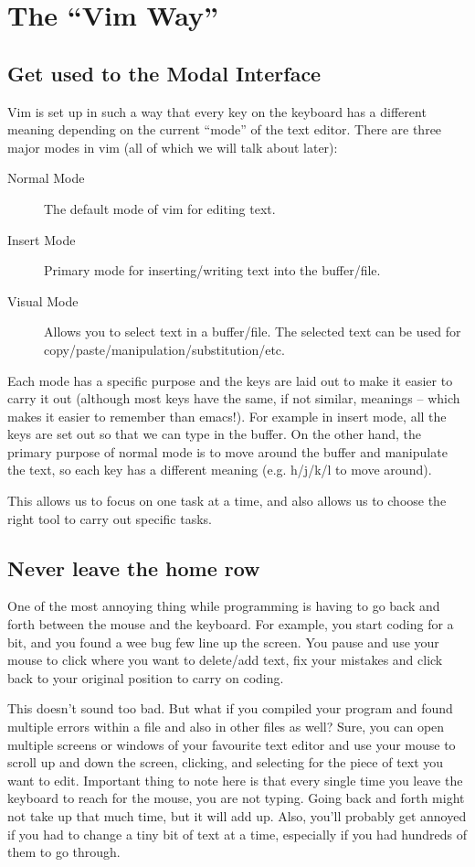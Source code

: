 \chapter{The ``Vim Way''}

\section{Get used to the Modal Interface}

Vim is set up in such a way that every key on the keyboard has a different meaning depending on the current ``mode'' of the text editor.
There are three major modes in vim (all of which we will talk about later):
\begin{description}
    \item [Normal Mode] The default mode of vim for editing text.
    \item [Insert Mode] Primary mode for inserting/writing text into the buffer/file.
    \item [Visual Mode] Allows you to select text in a buffer/file. The selected text can be used for copy/paste/manipulation/substitution/etc.
\end{description}

Each mode has a specific purpose and the keys are laid out to make it easier to carry it out (although most keys have the same, if not similar, meanings -- which makes it easier to remember than emacs!).
For example in insert mode, all the keys are set out so that we can type in the buffer.
On the other hand, the primary purpose of normal mode is to move around the buffer and manipulate the text, so each key has a different meaning (e.g. h/j/k/l to move around).

This allows us to focus on one task at a time, and also allows us to choose the right tool to carry out specific tasks.

\section{Never leave the home row}

One of the most annoying thing while programming is having to go back and forth between the mouse and the keyboard.
For example, you start coding for a bit, and you found a wee bug few line up the screen.
You pause and use your mouse to click where you want to delete/add text, fix your mistakes and click back to your original position to carry on coding.

This doesn't sound too bad.
But what if you compiled your program and found multiple errors within a file and also in other files as well?
Sure, you can open multiple screens or windows of your favourite text editor and use your mouse to scroll up and down the screen, clicking, and selecting for the piece of text you want to edit.
Important thing to note here is that every single time you leave the keyboard to reach for the mouse, you are not typing.
Going back and forth might not take up that much time, but it will add up.
Also, you'll probably get annoyed if you had to change a tiny bit of text at a time, especially if you had hundreds of them to go through.

